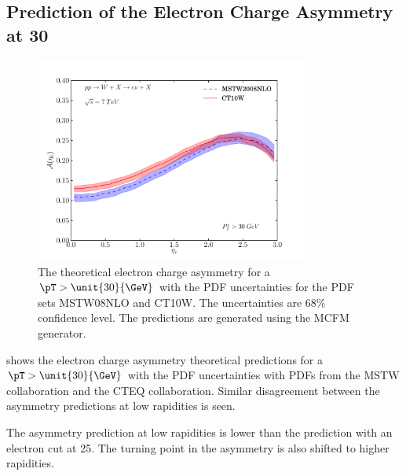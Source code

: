 \subsection{Prediction of the Electron Charge Asymmetry at \unit{30}{\GeV}}

\begin{figure}[htbp]
  \centering
  \includegraphics[width=0.8\textwidth]{asym-uncert-30}
  \caption{The theoretical electron charge
asymmetry\cite{monchenault2011predictions} for a $\pT>\unit{30}{\GeV}$ with the
{PDF} uncertainties for the {PDF} sets MSTW08NLO\cite{martin2009parton} and
CT10W\cite{lai2010vv}. The uncertainties are $68\%$ confidence level. The
predictions are generated using the {MCFM} \cite{campbellmcfm} generator.}
  \label{fig:asym-uncert}
\end{figure}

 shows the electron charge asymmetry theoretical
predictions for a $\pT>\unit{30}{\GeV}$ with the {PDF} uncertainties with PDFs
from the MSTW collaboration\cite{martin2009parton} and the CTEQ
collaboration\cite{lai2010vv}.  Similar disagreement between the asymmetry
predictions at low rapidities is seen.

The asymmetry prediction at low rapidities is lower than the prediction with an
electron cut at \unit{25}{\GeV}. The turning point in the asymmetry is also
shifted to higher rapidities.


